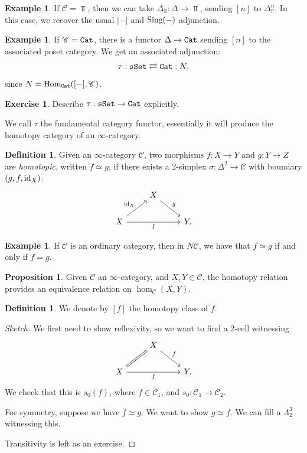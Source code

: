 \documentclass[12pt]{amsart}
\theoremstyle{definition}
\newtheorem{definition}[theorem]{Definition}
\newtheorem{example}[theorem]{Example}
\newtheorem{exercise}[theorem]{Exercise}
\newtheorem{proposition}[theorem]{Proposition}
\begin{document}
\begin{example} If $\mathscr{C} = \Top$, then we can take $\Delta_\Top: \Delta \to \Top$, sending $[n]$ to $\Delta^n_\Top$. In this case, we recover the usual $|-|$ and $\text{Sing}(-)$ adjunction.
\end{example}


\begin{example} If $\mathscr{C} = \texttt{Cat}$, there is a functor $\Delta \to \texttt{Cat}$ sending $[n]$ to the associated poset category. We get an associated adjunction:
\begin{align*}
    \tau: \texttt{sSet} \rightleftarrows \texttt{Cat}: N,
\end{align*}
since $N = \text{Hom}_{\texttt{Cat}}([-],\mathscr{C})$.
\end{example}

\begin{exercise} Describe $\tau: \texttt{sSet} \to \texttt{Cat}$ explicitly.
\end{exercise}

We call $\tau$ the fundamental category functor, essentially it will produce the homotopy category of an $\infty$-category.

\begin{definition} Given an $\infty$-category $\mathscr{C}$, two morphisms $f: X \to Y$ and $g: Y \to Z$ are \textit{homotopic}, written $f\simeq g$, if there exists a 2-simplex $\sigma: \Delta^2 \to \mathscr{C}$ with boundary $(g,f,\text{id}_X)$:
\[ \begin{tikzcd}
     & X\ar[dr,"g" above right] & \\
    X\ar[ur,"\id_X" above left]\ar[rr,"f" below] &  & Y.
\end{tikzcd} \]
\end{definition}

\begin{example} If $\mathscr{C}$ is an ordinary category, then in $N\mathscr{C}$, we have that $f\simeq g$ if and only if $f=g$.
\end{example}

\begin{proposition} Given $\mathscr{C}$ an $\infty$-category, and $X,Y\in \mathscr{C}$, the homotopy relation provides an equivalence relation on $\hom_\mathscr{C}(X,Y)$.
\end{proposition}

\begin{definition} We denote by $[f]$ the homotopy class of $f$.
\end{definition}

\begin{proof}[Sketch] We first need to show reflexivity, so we want to find a 2-cell witnessing
\[ \begin{tikzcd}
     & X\ar[dr,"f" above right] & \\
    X\ar[ur,equal]\ar[rr,"f" below] &  & Y.
\end{tikzcd} \]
We check that this is $s_0(f)$, where $f \in \mathscr{C}_1$, and $s_0 : \mathscr{C}_1 \to \mathscr{C}_2$.

For symmetry, suppose we have $f\simeq g$. We want to show $g\simeq f$. We can fill a $\Lambda^3_2$ witnessing this.

Transitivity is left as an exercise.
\end{proof}
\end{document}
